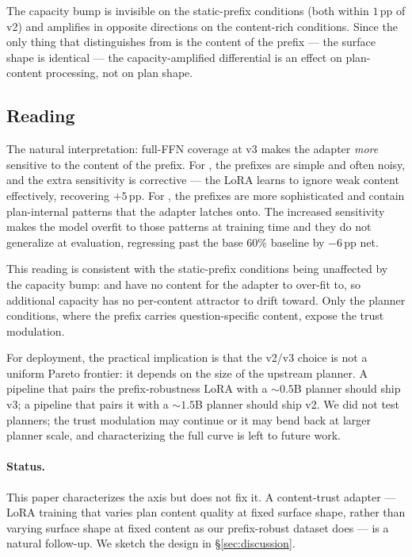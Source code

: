 The capacity bump is invisible on the static-prefix conditions
(both within $1$\,pp of v2) and amplifies in opposite directions
on the content-rich conditions.  Since the only thing that
distinguishes \cthree{} from \cthree{}
is the content of the prefix --- the surface shape is identical ---
the capacity-amplified differential is an effect on plan-content
processing, not on plan shape.

\subsection{Reading}
\label{subsec:axis2_reading}

The natural interpretation: full-FFN coverage at v3 makes the
adapter \emph{more} sensitive to the content of the prefix.  For
, the prefixes are simple and often noisy, and the
extra sensitivity is corrective --- the LoRA learns to ignore weak
content effectively, recovering $+5$\,pp.  For , the
prefixes are more sophisticated and contain plan-internal patterns
that the adapter latches onto.  The increased sensitivity makes
the model overfit to those patterns at training time and they do
not generalize at evaluation, regressing past the base $60\%$
baseline by $-6$\,pp net.

This reading is consistent with the static-prefix conditions being
unaffected by the capacity bump:  and
 have no content for the adapter
to over-fit to, so additional capacity has no per-content
attractor to drift toward.  Only the planner conditions, where
the prefix carries question-specific content, expose the trust
modulation.

For deployment, the practical implication is that the v2/v3 choice
is not a uniform Pareto frontier: it depends on the size of the
upstream planner.  A pipeline that pairs the prefix-robustness
LoRA with a $\sim 0.5$B planner should ship v3; a pipeline that
pairs it with a $\sim 1.5$B planner should ship v2.  We did not
test  planners; the trust modulation may continue or it
may bend back at larger planner scale, and characterizing the full
curve is left to future work.

\paragraph{Status.}
This paper characterizes the axis but does not fix it.  A
content-trust adapter --- LoRA training that varies plan content
quality at fixed surface shape, rather than varying surface shape
at fixed content as our prefix-robust dataset does --- is a
natural follow-up.  We sketch the design in
\S\ref{sec:discussion}.
